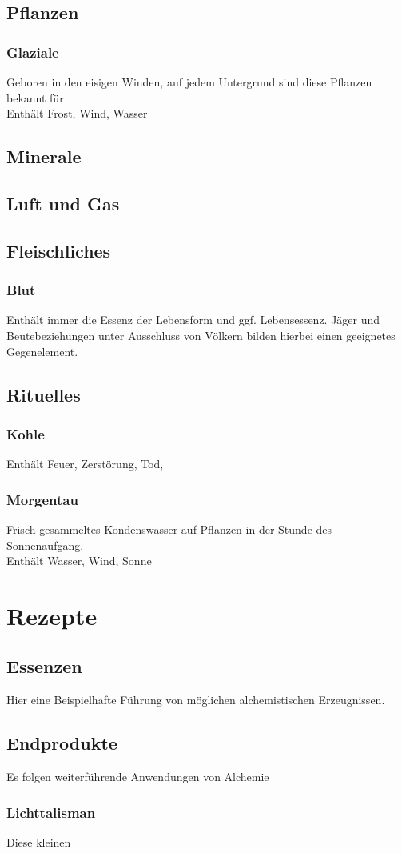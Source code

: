 \documentclass[a4paper,12pt,oneside]{book}
\begin{document}
\chapter{Pflanzen}

\section{Glaziale}
Geboren in den eisigen Winden, auf jedem Untergrund sind diese Pflanzen bekannt für 
\\Enthält Frost, Wind, Wasser

\chapter{Minerale}

\chapter{Luft und Gas}

\chapter{Fleischliches}

\section{Blut}
Enthält immer die Essenz der Lebensform und ggf. Lebensessenz. Jäger und Beutebeziehungen unter Ausschluss von Völkern bilden hierbei einen geeignetes Gegenelement.

\chapter{Rituelles}

\section{Kohle}
Enthält Feuer, Zerstörung, Tod, 

\section{Morgentau}
Frisch gesammeltes Kondenswasser auf Pflanzen in der Stunde des Sonnenaufgang.
\\Enthält Wasser, Wind, Sonne


\part{Rezepte}


\chapter{Essenzen}
Hier eine Beispielhafte Führung von möglichen alchemistischen Erzeugnissen.

\chapter{Endprodukte}
Es folgen weiterführende Anwendungen von Alchemie

\section{Lichttalisman}
Diese kleinen
\end{document}
